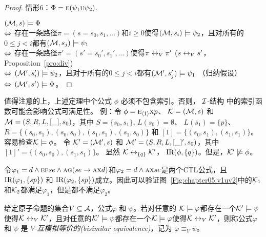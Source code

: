 \begin{proof}
	情形6：$\Phi = \textsc{e} (\psi_1 \textsc{u} \psi_2)$.
	
	$({\cal M},s) \models \Phi$\\
	$\Leftrightarrow$ 存在一条路径$\pi=(s=s_0,s_1,\dots)$和$i \ge 0$使得$({\cal M},s_i) \models \psi_2$，且对所有的$0\leq j <i$都有$({\cal M},s_j)\models \psi_1$\\
	$\Leftrightarrow$ 存在一条路径$\pi'=(s'=s_0',s_1',\dots)$使得$\pi \leftrightarrow_V \pi'$ \hfill ($s \leftrightarrow_V s'$，Proposition~\ref{pro:div})\\
	$\Leftrightarrow$ $({\cal M}',s_i') \models \psi_2$，且对于所有的$0\leq j <i$都有$({\cal M}',s_j')\models \psi_1$  \hfill  （归纳假设）\\
	$\Leftrightarrow$ $({\cal M}',s')\models \Phi$。
\end{proof}

值得注意的上，上述定理中个公式 $\phi$ 必须不包含索引。否则， ${\cal I}$-结构 中的索引函数可能会影响公式可满足性。
例：令 $\phi=\textsc{e}_{{\langle{1}\rangle}}\textsc{x} p$、
${\cal K}=({\cal M},s)$ 和 ${\cal M}=(S,R,L,[\_],s_0)$，其中 $S=\{s_0,s_1\}$, $L(s_0)=\emptyset$、 $L(s_1)=\{p\}$、
$R=\{(s_0,s_1),(s_0,s_0),(s_1,s_1), (s_1,s_0)\}$ 和 $[1]=\{(s_0,s_1), (s_1,s_1)\}$。容易检查${\cal K}\models\phi$。
令 ${\cal K}'=({\cal M}',s)$ 和 ${\cal M}'=(S,R,L,[\_]',s_0)$，其中 $[1]'=\{(s_0,s_0),(s_1,s_1)\}$。
显然 ${\cal K}\leftrightarrow_{\{q\}}{\cal K}'$， $\textrm{IR}(\phi,\{q\})$。但是，${\cal K}'\not\models\phi$。

\begin{example}
	令$\varphi_1 = d \wedge \textsc{e}\textsc{f} se \wedge \textsc{a}\textsc{g}(se \rightarrow \textsc{a}\textsc{x} d)$和$\varphi_2=d \wedge \textsc{a}\textsc{x} se$是两个$\textrm{CTL}$公式，且$\textrm{IR}(\varphi_1,\{sp\})$ 和 $\textrm{IR}(\varphi_2,\{sp\})$成立。因此可以验证图~\ref{Fig:chapter05:v1uv2}中的${\cal K}_1$和${\cal K}_2$都满足$\varphi_1$，但是都不满足$\varphi_2$。
\end{example}

\begin{definition}\label{def:bisimular:equivalene}
	给定原子命题的集合$V\subseteq {\cal A}$，公式$\varphi$ 和 $\psi$。若对任意的 ${\cal K}\models \varphi$都存在一个${\cal K}'\models\psi$使得${\cal K}\leftrightarrow_V{\cal K}'$，且对任意的${\cal K}'\models\psi$都存在一个${\cal K}\models \varphi$使得${\cal K}\leftrightarrow_V{\cal K}'$，则称公式$\varphi$ 和 $\psi$ 是 {\em $V$-互模拟等价的(bisimilar equivalence)}，记为 $\varphi\equiv_V\psi$。
\end{definition}

